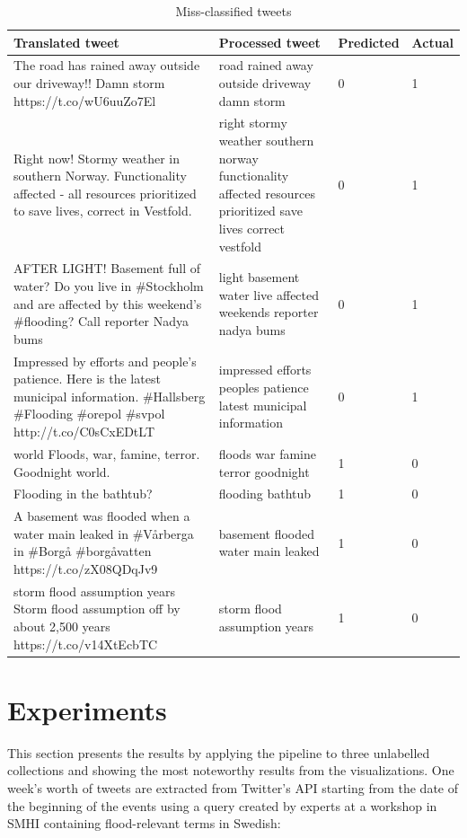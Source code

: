 \begin{table}
  \center
  \begin{tabular}{|L{0.35\textwidth}|L{0.35\textwidth}|l|l|}
    \hline
    Translated tweet & Processed tweet & Predicted & Actual \\
    \hline
    The road has rained away outside our driveway!! Damn storm https://t.co/wU6uuZo7El &
    road rained away outside driveway damn storm & 0 & 1 \\
    \hline
    Right now! Stormy weather in southern Norway. Functionality affected - all resources prioritized to save lives, correct in Vestfold. &
    right stormy weather southern norway functionality affected resources prioritized save lives correct vestfold & 0 & 1\\
    \hline
    AFTER LIGHT! Basement full of water? Do you live in \#Stockholm and are affected by this weekend's
    \#flooding? Call reporter Nadya bums &
    light basement water live affected weekends reporter nadya bums & 0 & 1\\
    \hline
    Impressed by efforts and people's patience. Here is the latest municipal information. \#Hallsberg
    \#Flooding \#orepol \#svpol http://t.co/C0sCxEDtLT &
    impressed efforts peoples patience latest municipal information & 0 & 1 \\
    \hline
    world Floods, war, famine, terror. Goodnight world. & 
    floods war famine terror goodnight & 1 & 0 \\
    \hline
    Flooding in the bathtub? & 
    flooding bathtub & 1 & 0 \\
    \hline
    A basement was flooded when a water main leaked in \#Vårberga in \#Borgå \#borgåvatten https://t.co/zX08QDqJv9 & 
    basement flooded water main leaked & 1 & 0 \\
    \hline
    storm flood assumption years Storm flood assumption off by about 2,500 years https://t.co/v14XtEcbTC & 
    storm flood assumption years & 1 & 0 \\
    \hline
  \end{tabular}
  \caption{Miss-classified tweets}
  \label{tab:tweets_missclassified}
\end{table}


\section{Experiments}%
\label{sec:Experiments}

This section presents the results by applying the pipeline to three unlabelled collections and
showing the most noteworthy results from the visualizations. One week's worth of tweets are
extracted from Twitter's API starting from the date of the beginning of the events using a query
created by experts at a workshop in \ac{SMHI} containing flood-relevant terms in Swedish:

